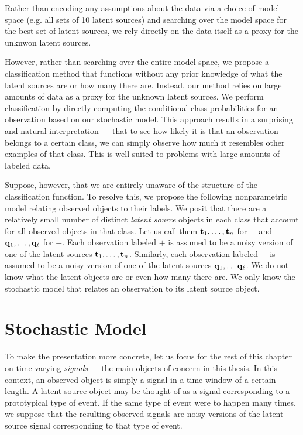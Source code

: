 
Rather than encoding any assumptions about the data via a choice of model space
(e.g. all sets of 10 latent sources) and searching over the model space for the
best set of latent sources, we rely directly on the data itself as a proxy for
the unknwon latent sources.

However, rather than searching over the entire model space, we propose a
classification method that functions without any prior knowledge of what the
latent sources are or how many there are. Instead, our method relies on large
amounts of data as a proxy for the unknown latent sources. We perform
classification by directly computing the conditional class probabilities for an
observation based on our stochastic model. This approach results in a surprising
and natural interpretation --- that to see how likely it is that an observation
belongs to a certain class, we can simply observe how much it resembles other
examples of that class. This is well-suited to problems with large amounts of
labeled data.


Suppose, however, that we are entirely unaware of the structure of the
classification function. To resolve this, we propose the following nonparametric
model relating observed objects to their labels. We posit that there are a
relatively small number of distinct {\em latent source} objects in each class
that account for all observed objects in that class. Let us call them $\mathbf t_1,
\dots, \mathbf t_n$ for $+$ and $\mathbf q_1, \dots, \mathbf q_{\ell}$ for $-$. Each
observation labeled $+$ is assumed to be a noisy version of one of the latent
sources $\mathbf t_1, \dots, \mathbf t_n$. Similarly, each observation labeled $-$ is
assumed to be a noisy version of one of the latent sources $\mathbf q_1, \dots \mathbf
q_{\ell}$. We do not know what the latent objects are or even how many there
are. We only know the stochastic model that relates an observation to its latent
source object.

\section{Stochastic Model}
To make the presentation more concrete, let us focus for the rest of this
chapter on time-varying {\em signals} --- the main objects of concern in this
thesis. In this context, an observed object is simply a signal in a time window
of a certain length.  A latent source object may be thought of as a signal
corresponding to a prototypical type of event. If the same type of event were to
happen many times, we suppose that the resulting observed signals are noisy
versions of the latent source signal corresponding to that type of event.

